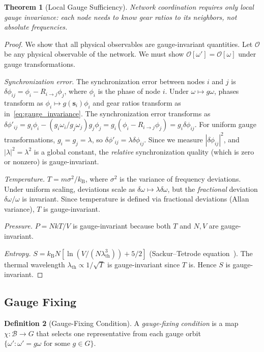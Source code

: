 \documentclass[11pt,twocolumn,a4paper]{article}
\newtheorem{theorem}{Theorem}[section]
\theoremstyle{definition}
\newtheorem{definition}[theorem]{Definition}
\newcommand{\kB}{k_{\mathrm{B}}}
\newcommand{\Bsp}{\mathcal{B}}
\newcommand{\Rij}{R_{i \to j}}
\begin{document}
\begin{theorem}[Local Gauge Sufficiency]\label{thm:local_gauge}
Network coordination requires only local gauge invariance: each node needs to know gear
ratios to its neighbors, not absolute frequencies.
\end{theorem}

\begin{proof}
We show that all physical observables are gauge-invariant quantities. Let $\mathcal{O}$
be any physical observable of the network. We must show $\mathcal{O}[\omega'] = \mathcal{O}[\omega]$
under gauge transformations.

\emph{Synchronization error.} The synchronization error between nodes $i$ and $j$ is
$\delta\phi_{ij} = \phi_i - \Rij \phi_j$, where $\phi_i$ is the phase of node $i$.
Under $\omega \mapsto g\omega$, phases transform as $\phi_i \mapsto g(\mathbf{s}_i)\phi_i$
and gear ratios transform as in~\eqref{eq:gauge_invariance}. The synchronization error
transforms as $\delta\phi'_{ij} = g_i \phi_i - (g_i \omega_i / g_j \omega_j) g_j \phi_j
= g_i(\phi_i - \Rij \phi_j) = g_i \delta\phi_{ij}$. For uniform gauge transformations,
$g_i = g_j = \lambda$, so $\delta\phi'_{ij} = \lambda \delta\phi_{ij}$. Since we measure
$|\delta\phi_{ij}|^2$, and $|\lambda|^2 = \lambda^2$ is a global constant, the
\emph{relative} synchronization quality (which is zero or nonzero) is gauge-invariant.

\emph{Temperature.} $T = m\sigma^2/\kB$, where $\sigma^2$ is the variance of frequency
deviations. Under uniform scaling, deviations scale as $\delta\omega \mapsto \lambda\delta\omega$,
but the \emph{fractional} deviation $\delta\omega/\omega$ is invariant. Since temperature
is defined via fractional deviations (Allan variance), $T$ is gauge-invariant.

\emph{Pressure.} $P = NkT/V$ is gauge-invariant because both $T$ and $N, V$ are
gauge-invariant.

\emph{Entropy.} $S = \kB N[\ln(V/(N\lambda_{\mathrm{th}}^3)) + 5/2]$ (Sackur--Tetrode
equation~\cite{pathria2011}). The thermal wavelength $\lambda_{\mathrm{th}} \propto 1/\sqrt{T}$
is gauge-invariant since $T$ is. Hence $S$ is gauge-invariant.
\end{proof}

\subsection{Gauge Fixing}\label{sec:gauge:fixing}

\begin{definition}[Gauge-Fixing Condition]\label{def:gauge_fixing}
A \emph{gauge-fixing condition} is a map $\chi: \Bsp \to G$ that selects one representative
from each gauge orbit $\{\omega' : \omega' = g\omega \text{ for some } g \in G\}$.
\end{definition}
\end{document}
